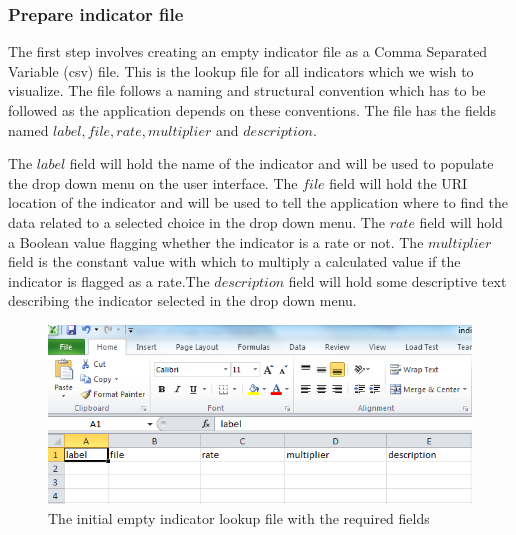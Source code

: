 \subsubsection{Prepare indicator file}

The first step involves creating an empty indicator file as a Comma Separated Variable (csv) file. This is the lookup file for all indicators which we wish to visualize. The file follows a naming and structural convention which has to be followed as the application depends on these conventions. The file has the fields named $label, file, rate, multiplier$ and $description$. 

The $label$ field will hold the name of the indicator and will be used to populate the drop down menu on the user interface. The $file$ field will hold the URI location of the indicator and will be used to tell the application where to find the data related to a selected choice in the drop down menu. The $rate$ field will hold a Boolean value flagging whether the indicator is a rate or not. The $multiplier$ field is the constant value with which to multiply a calculated value if the indicator is flagged as a rate.The $description$ field will hold some descriptive text describing the indicator selected in the drop down menu.

\begin{figure}[!ht] 
\centering
\includegraphics[scale=0.5]{./Chapter5/images/indicatorfile}
\caption{The initial empty indicator lookup file with the required fields}
\label{fig4}
\end{figure}